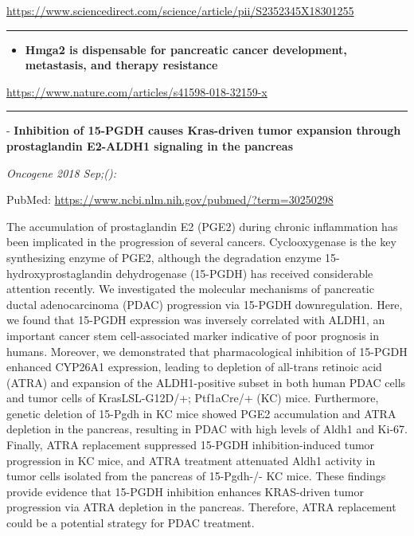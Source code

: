 \documentclass[]{article}
\providecommand{\tightlist}{%
  \setlength{\itemsep}{0pt}\setlength{\parskip}{0pt}}
\begin{document}
\url{https://www.sciencedirect.com/science/article/pii/S2352345X18301255}

\begin{center}\rule{0.5\linewidth}{\linethickness}\end{center}

\begin{itemize}
\tightlist
\item
  \textbf{Hmga2 is dispensable for pancreatic cancer development,
  metastasis, and therapy resistance}
\end{itemize}

\url{https://www.nature.com/articles/s41598-018-32159-x}

\begin{center}\rule{0.5\linewidth}{\linethickness}\end{center}

 - \textbf{Inhibition of 15-PGDH causes Kras-driven tumor expansion
through prostaglandin E2-ALDH1 signaling in the pancreas}

\emph{Oncogene 2018 Sep;():}

PubMed: \url{https://www.ncbi.nlm.nih.gov/pubmed/?term=30250298}

The accumulation of prostaglandin E2 (PGE2) during chronic inflammation
has been implicated in the progression of several cancers.
Cyclooxygenase is the key synthesizing enzyme of PGE2, although the
degradation enzyme 15-hydroxyprostaglandin dehydrogenase (15-PGDH) has
received considerable attention recently. We investigated the molecular
mechanisms of pancreatic ductal adenocarcinoma (PDAC) progression via
15-PGDH downregulation. Here, we found that 15-PGDH expression was
inversely correlated with ALDH1, an important cancer stem
cell-associated marker indicative of poor prognosis in humans. Moreover,
we demonstrated that pharmacological inhibition of 15-PGDH enhanced
CYP26A1 expression, leading to depletion of all-trans retinoic acid
(ATRA) and expansion of the ALDH1-positive subset in both human PDAC
cells and tumor cells of KrasLSL-G12D/+; Ptf1aCre/+ (KC) mice.
Furthermore, genetic deletion of 15-Pgdh in KC mice showed PGE2
accumulation and ATRA depletion in the pancreas, resulting in PDAC with
high levels of Aldh1 and Ki-67. Finally, ATRA replacement suppressed
15-PGDH inhibition-induced tumor progression in KC mice, and ATRA
treatment attenuated Aldh1 activity in tumor cells isolated from the
pancreas of 15-Pgdh-/- KC mice. These findings provide evidence that
15-PGDH inhibition enhances KRAS-driven tumor progression via ATRA
depletion in the pancreas. Therefore, ATRA replacement could be a
potential strategy for PDAC treatment.
\end{document}
